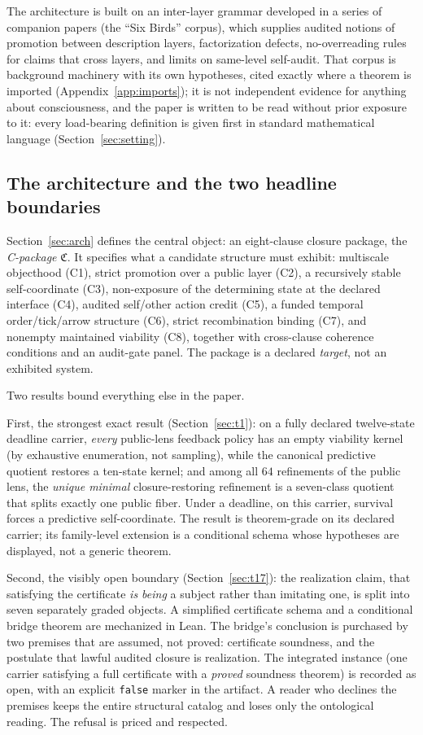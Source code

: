 \documentclass[11pt]{article}
\newcommand{\Cpkg}{\mathfrak{C}}
\theoremstyle{definition}
\begin{document}
The architecture is built on an inter-layer grammar developed in a series of
companion papers (the ``Six Birds'' corpus), which supplies audited notions of
promotion between description layers, factorization defects, no-overreading
rules for claims that cross layers, and limits on same-level self-audit. That
corpus is background machinery with its own hypotheses, cited exactly where a
theorem is imported (Appendix~\ref{app:imports}); it is not independent
evidence for anything about consciousness, and the paper is written to be read
without prior exposure to it: every load-bearing definition is given first in
standard mathematical language (Section~\ref{sec:setting}).

\subsection{The architecture and the two headline boundaries}

Section~\ref{sec:arch} defines the central object: an eight-clause closure
package, the \emph{C-package} $\Cpkg$. It specifies what a candidate
structure must exhibit: multiscale objecthood (C1), strict promotion over a
public layer (C2), a recursively stable self-coordinate (C3), non-exposure of
the determining state at the declared interface (C4), audited self/other action
credit (C5), a funded temporal order/tick/arrow structure (C6), strict
recombination binding (C7), and nonempty maintained viability (C8), together
with cross-clause coherence conditions and an audit-gate panel. The package is
a declared \emph{target}, not an exhibited system.

Two results bound everything else in the paper.

First, the strongest exact result (Section~\ref{sec:t1}): on a fully declared
twelve-state deadline carrier, \emph{every} public-lens feedback policy has an
empty viability kernel (by exhaustive enumeration, not sampling), while the
canonical predictive quotient restores a ten-state kernel; and among all $64$
refinements of the public lens, the \emph{unique minimal} closure-restoring
refinement is a seven-class quotient that splits exactly one public fiber.
Under a deadline, on this carrier, survival forces a predictive
self-coordinate. The result is theorem-grade on its declared carrier; its
family-level extension is a conditional schema whose hypotheses are displayed,
not a generic theorem.

Second, the visibly open boundary (Section~\ref{sec:t17}): the realization
claim, that satisfying the certificate \emph{is being} a subject rather than
imitating one, is split into seven separately graded objects. A simplified
certificate schema and a conditional bridge theorem are mechanized in Lean.
The bridge's conclusion is purchased by two premises that are assumed, not
proved: certificate soundness, and the postulate that lawful audited closure
is realization. The integrated instance (one carrier satisfying a full
certificate with a \emph{proved} soundness theorem) is recorded as open, with
an explicit \texttt{false} marker in the artifact. A reader who declines the
premises keeps the entire structural catalog and loses only the ontological
reading. The refusal is priced and respected.
\end{document}
